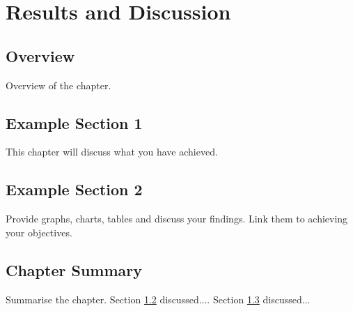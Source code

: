 \chapter{Results and Discussion}\label{chap:results}

\section{Overview}
Overview of the chapter.

\section{Example Section 1}\label{sec:example1}
This chapter will discuss what you have achieved.

\section{Example Section 2}\label{sec:example2}
Provide graphs, charts, tables and discuss your findings. Link them to achieving your objectives.

\section{Chapter Summary}
Summarise the chapter. Section \ref{sec:example1} discussed.... Section \ref{sec:example2} discussed...